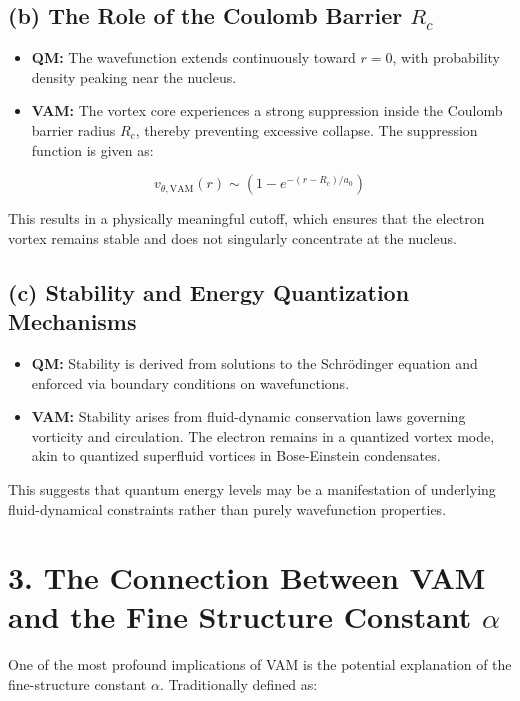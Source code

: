 \subsection*{(b) The Role of the Coulomb Barrier \(R_c\)}

\begin{itemize}
    \item \textbf{QM:} The wavefunction extends continuously toward \(r = 0\), with probability density peaking near the nucleus.
    \item \textbf{VAM:} The vortex core experiences a strong suppression inside the Coulomb barrier radius \(R_c\), thereby preventing excessive collapse. The suppression function is given as:
\end{itemize}

\[
    v_{\theta, \text{VAM}}(r) \sim \left(1 - e^{-(r - R_c)/a_0}\right)
\]

This results in a physically meaningful cutoff, which ensures that the electron vortex remains stable and does not singularly concentrate at the nucleus.

\subsection*{(c) Stability and Energy Quantization Mechanisms}

\begin{itemize}
    \item \textbf{QM:} Stability is derived from solutions to the Schrödinger equation and enforced via boundary conditions on wavefunctions.
    \item \textbf{VAM:} Stability arises from fluid-dynamic conservation laws governing vorticity and circulation. The electron remains in a quantized vortex mode, akin to quantized superfluid vortices in Bose-Einstein condensates.
\end{itemize}

This suggests that quantum energy levels may be a manifestation of underlying fluid-dynamical constraints rather than purely wavefunction properties.

\section*{3. The Connection Between VAM and the Fine Structure Constant \(\alpha\)}

One of the most profound implications of VAM is the potential explanation of the fine-structure constant \(\alpha\). Traditionally defined as:

